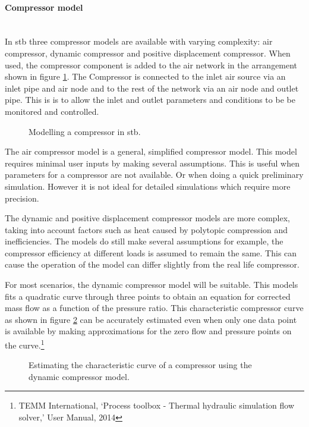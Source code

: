 		\paragraph{Compressor model}\leavevmode\\
		In \gls{stb} three compressor models are available with varying complexity: air compressor, dynamic compressor and positive displacement compressor. When used, the compressor component is added to the air network in the arrangement shown in figure \ref{fig: Compressor models}. The Compressor is connected to the inlet air source via an inlet pipe and air node and to the rest of the network via an air node and outlet pipe. This is is to allow the inlet and outlet parameters and conditions to be be monitored and controlled.
		\begin{figure}[h]
			\centering
			\caption{Modelling a compressor in \gls{stb}.}
			\label{fig: Compressor models}
		\end{figure}
		\par
		 The air compressor model is a general, simplified compressor model. This model requires minimal user inputs by making several assumptions. This is useful when parameters for a compressor are not available. Or when doing a quick preliminary simulation. However it is not ideal for detailed simulations which require more precision.
		 \par 
		 The dynamic and positive displacement compressor models are more complex, taking into account factors such as heat caused by polytopic compression and inefficiencies. The models do still make several assumptions for example, the compressor efficiency at different loads is assumed to remain the same. This can cause the operation of the model can differ slightly from the real life compressor.
		 \par
		 For most scenarios, the dynamic compressor model will be suitable. This models fits a quadratic curve through three points to obtain an equation for corrected mass flow as a function of the pressure ratio. This characteristic compressor curve as shown in figure \ref{fig: Compressor Curve} can be accurately estimated even when only one data point is available by making approximations for the zero flow and pressure points on the curve.\footnote{TEMM International, \enquote*{Process toolbox - Thermal hydraulic simulation flow solver,} User Manual, 2014} 
			\begin{figure}[h]
				\centering
				\fbox{}
				\caption{Estimating the characteristic curve of a compressor using the dynamic compressor model.}
				\label{fig: Compressor Curve}
			\end{figure}
